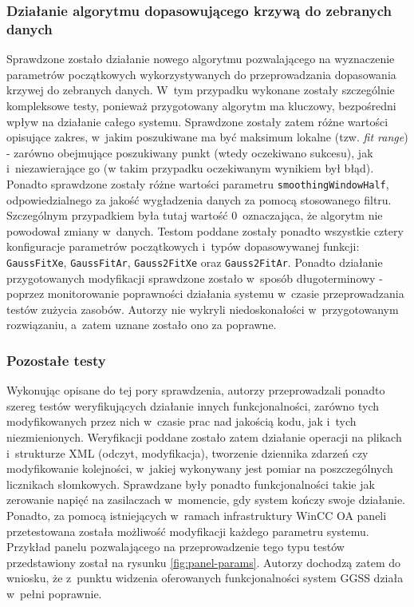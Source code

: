 \subsubsection*{Działanie algorytmu dopasowującego krzywą do zebranych danych}
Sprawdzone zostało działanie nowego algorytmu pozwalającego na wyznaczenie parametrów początkowych wykorzystywanych do przeprowadzania dopasowania krzywej do zebranych danych. W~tym przypadku wykonane zostały szczególnie kompleksowe testy, ponieważ przygotowany algorytm ma kluczowy, bezpośredni wpływ na działanie całego systemu. Sprawdzone zostały zatem różne wartości opisujące zakres, w~jakim poszukiwane ma być maksimum lokalne (tzw. \emph{fit range}) - zarówno obejmujące poszukiwany punkt (wtedy oczekiwano sukcesu), jak i~niezawierające go (w takim przypadku oczekiwanym wynikiem był błąd). Ponadto sprawdzone zostały różne wartości parametru \lstinline{smoothingWindowHalf}, odpowiedzialnego za jakość wygładzenia danych za pomocą stosowanego filtru. Szczególnym przypadkiem była tutaj wartość 0~oznaczająca, że algorytm nie powodował zmiany w~danych. Testom poddane zostały ponadto wszystkie cztery konfiguracje parametrów początkowych i~typów dopasowywanej funkcji: \lstinline{GaussFitXe}, \lstinline{GaussFitAr}, \lstinline{Gauss2FitXe} oraz \lstinline{Gauss2FitAr}. Ponadto działanie przygotowanych modyfikacji sprawdzone zostało w~sposób długoterminowy - poprzez monitorowanie poprawności działania systemu w~czasie przeprowadzania testów zużycia zasobów. Autorzy nie wykryli niedoskonałości w~przygotowanym rozwiązaniu, a~zatem uznane zostało ono za poprawne.

\subsubsection*{Pozostałe testy}
Wykonując opisane do tej pory sprawdzenia, autorzy przeprowadzali ponadto szereg testów weryfikujących działanie innych funkcjonalności, zarówno tych modyfikowanych przez nich w~czasie prac nad jakością kodu, jak i~tych niezmienionych. Weryfikacji poddane zostało zatem działanie operacji na plikach i~strukturze XML (odczyt, modyfikacja), tworzenie dziennika zdarzeń czy modyfikowanie kolejności, w~jakiej wykonywany jest pomiar na poszczególnych licznikach słomkowych. Sprawdzane były ponadto funkcjonalności takie jak zerowanie napięć na zasilaczach w~momencie, gdy system kończy swoje działanie. Ponadto, za pomocą istniejących w~ramach infrastruktury WinCC OA paneli przetestowana została możliwość modyfikacji każdego parametru systemu. Przykład panelu pozwalającego na przeprowadzenie tego typu testów przedstawiony został na rysunku \ref{fig:panel-params}. Autorzy dochodzą zatem do wniosku, że z~punktu widzenia oferowanych funkcjonalności system GGSS działa w~pełni poprawnie.

